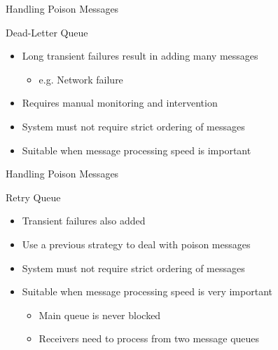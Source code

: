\documentclass{slide}
\begin{document}
\begin{frame}{Handling Poison Messages}
    \vspace{1mm}
    {\LARGE
        Dead-Letter Queue
        \begin{itemize}
            \Large\item Long transient failures result in adding many messages
            \begin{itemize}
                \large\item e.g. Network failure
            \end{itemize}
            \Large\item Requires manual monitoring and intervention
            \Large\item System must not require strict ordering of messages
            \Large\item Suitable when message processing speed is important
        \end{itemize}
    }
\end{frame}

\begin{frame}{Handling Poison Messages}
    \vspace{1mm}
    {\LARGE
        Retry Queue
        \begin{itemize}
            \Large\item Transient failures also added
            \Large\item Use a previous strategy to deal with poison messages
            \Large\item System must not require strict ordering of messages
            \vspace{4pt}
            \Large\item Suitable when message processing speed is very important
            \begin{itemize}
                \large\item Main queue is never blocked
                \vspace{2pt}
                \large\item Receivers need to process from two message queues
            \end{itemize}
        \end{itemize}
    }
\end{frame}

\end{document}
